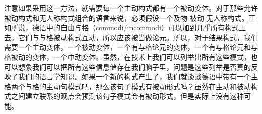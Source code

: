 注意如果采用这一方法，就需要每一个主动构式都有一个被动变体。对于那些允许被动构式和无人称构式组合的语言来说，必须假设一个及物-被动-无人称构式。正如所说，德语中的自由与格（commodi/incommodi）可以加到几乎所有构式上去。它们与与格被动构式互动，所以应该被当做论元。所以，对于结果构式，我们需要一个主动变体，一个被动变体，一个有与格论元的变体，一个有与格论元和与格被动的变体，一个中动变体。虽然，在技术上我们可以列举出所有这些模式，也可以想象我们可以把所有这些信息储存在我们脑子里，问题是这些列举是否真的反映了我们的语言学知识。如果一个新的构式产生了，我们就谈谈德语中带有一个主格两个与格的主动句模式吧，那么该句子模式有被动形式吗？虽然在主动和被动构式之间建立联系的观点会预测该句子模式会有被动形式，但是实际上没有这种可能。

